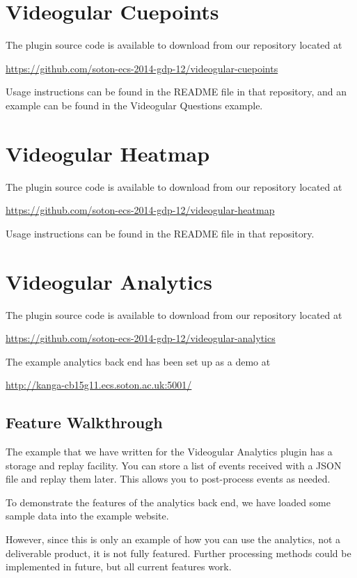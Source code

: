 \documentclass[12pt,a4paper]{article}
\begin{document}
\section{Videogular Cuepoints}

The plugin source code is available to download from our repository located at

\url{https://github.com/soton-ecs-2014-gdp-12/videogular-cuepoints}

Usage instructions can be found in the README file in that repository, and an example can be found in the Videogular Questions example.

\section{Videogular Heatmap}

The plugin source code is available to download from our repository located at

\url{https://github.com/soton-ecs-2014-gdp-12/videogular-heatmap}

Usage instructions can be found in the README file in that repository.

\section{Videogular Analytics}

The plugin source code is available to download from our repository located at

\url{https://github.com/soton-ecs-2014-gdp-12/videogular-analytics}

The example analytics back end has been set up as a demo at

\url{http://kanga-cb15g11.ecs.soton.ac.uk:5001/}

\subsection{Feature Walkthrough}

The example that we have written for the Videogular Analytics plugin has a storage and replay facility. You can store a list of events received with a JSON file and replay them later. This allows you to post-process events as needed.

To demonstrate the features of the analytics back end, we have loaded some sample data into the example website.

However, since this is only an example of how you can use the analytics, not a deliverable product, it is not fully featured. Further processing methods could be implemented in future, but all current features work.
\end{document}
